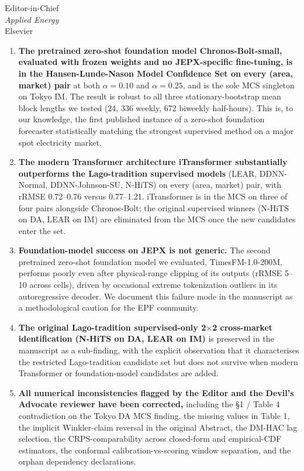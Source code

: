 \documentclass[11pt,a4paper]{letter}
\begin{document}
\begin{letter}{Editor-in-Chief \\ \emph{Applied Energy} \\ Elsevier}
\begin{enumerate}
\item \textbf{The pretrained zero-shot foundation model Chronos-Bolt-small, evaluated with frozen weights and no JEPX-specific fine-tuning, is in the Hansen-Lunde-Nason Model Confidence Set on every (area, market) pair} at both \(\alpha = 0.10\) and \(\alpha = 0.25\), and is the sole MCS singleton on Tokyo IM. The result is robust to all three stationary-bootstrap mean block lengths we tested (24, 336 weekly, 672 biweekly half-hours). This is, to our knowledge, the first published instance of a zero-shot foundation forecaster statistically matching the strongest supervised method on a major spot electricity market.
\item \textbf{The modern Transformer architecture iTransformer substantially outperforms the Lago-tradition supervised models} (LEAR, DDNN-Normal, DDNN-Johnson-SU, N-HiTS) on every (area, market) pair, with rRMSE 0.72--0.76 versus 0.77--1.21. iTransformer is in the MCS on three of four pairs alongside Chronos-Bolt; the original supervised winners (N-HiTS on DA, LEAR on IM) are eliminated from the MCS once the new candidates enter the set.
\item \textbf{Foundation-model success on JEPX is not generic.} The second pretrained zero-shot foundation model we evaluated, TimesFM-1.0-200M, performs poorly even after physical-range clipping of its outputs (rRMSE 5--10 across cells), driven by occasional extreme tokenization outliers in its autoregressive decoder. We document this failure mode in the manuscript as a methodological caution for the EPF community.
\item \textbf{The original Lago-tradition supervised-only 2$\times$2 cross-market identification (N-HiTS on DA, LEAR on IM)} is preserved in the manuscript as a sub-finding, with the explicit observation that it characterises the restricted Lago-tradition candidate set but does not survive when modern Transformer or foundation-model candidates are added.
\item \textbf{All numerical inconsistencies flagged by the Editor and the Devil's Advocate reviewer have been corrected,} including the §1 / Table 4 contradiction on the Tokyo DA MCS finding, the missing values in Table 1, the implicit Winkler-claim reversal in the original Abstract, the DM-HAC lag selection, the CRPS-comparability across closed-form and empirical-CDF estimators, the conformal calibration-vs-scoring window separation, and the orphan dependency declarations.
\end{enumerate}


\end{letter}
\end{document}
